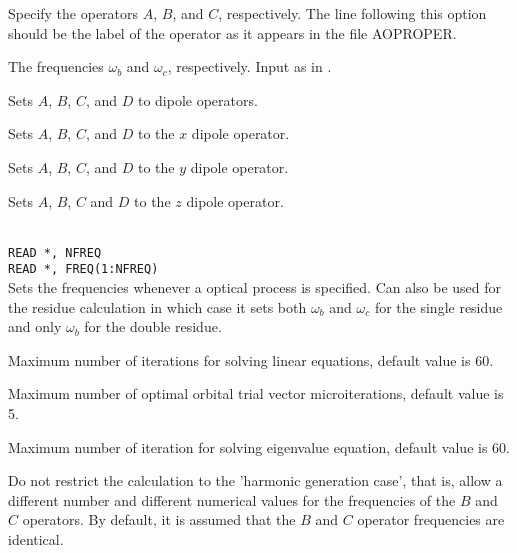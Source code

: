 \begin{description}

\item[, , ]
Specify the operators $A$, $B$, and $C$, respectively.
The line following this
option should be the label of the operator as it appears in the file
AOPROPER.

\item[, ]
The frequencies
$\omega_b$ and $\omega_c$, respectively. Input as in
.

\item{}
Sets $A$, $B$, $C$, and $D$ to dipole operators.

\item{}
Sets $A$, $B$, $C$, and $D$ to the $x$ dipole operator.

\item{}
Sets $A$, $B$, $C$, and $D$ to the $y$ dipole operator.

\item{}
Sets $A$, $B$, $C$ and $D$ to the $z$ dipole operator.

\item{}\\
\verb|READ *, NFREQ|\\
\verb|READ *, FREQ(1:NFREQ)|\\
Sets the frequencies whenever a optical process is specified.
Can also be used for the residue calculation in which case it sets
both $\omega_b$ and $\omega_c$ for the single residue and only
$\omega_b$ for the double residue.

\item{}
Maximum number of iterations for solving linear equations, default value is 60.

\item{}
Maximum number of optimal orbital trial vector microiterations,
default value is 5. 

\item{}
Maximum number of iteration for solving eigenvalue equation, default
value is 60.

\item{} Do not restrict the calculation to the 'harmonic
  generation case', that is, allow a different number and different
  numerical values for the frequencies of the $B$ and $C$
  operators. By default, it is assumed that the $B$ and $C$ operator
  frequencies are identical.


\end{description}
